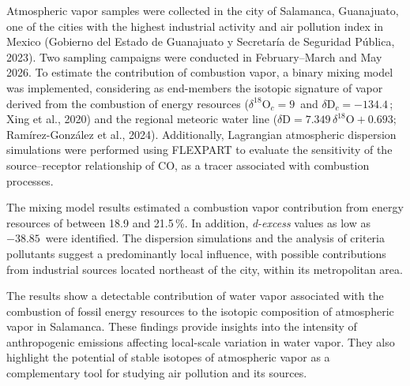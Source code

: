 Atmospheric vapor samples were collected in the city of 
Salamanca, Guanajuato, one of the cities with the highest 
industrial activity and air pollution index in Mexico 
(Gobierno del Estado de Guanajuato y Secretaría de Seguridad Pública, 2023). 
Two sampling campaigns were conducted in February--March and May 2026. To 
estimate the contribution of combustion vapor, a binary mixing model was 
implemented, considering as end-members the isotopic signature of vapor derived 
from the combustion of energy resources ($\delta^{18}\mathrm{O}_c = 9$\,\textperthousand{} 
and $\delta\mathrm{D}_c = -134.4$\,\textperthousand{}; Xing et al., 2020) and 
the regional meteoric water line ($\delta\mathrm{D} = 7.349\,\delta^{18}\mathrm{O} + 0.693$; 
Ramírez-González et al., 2024). Additionally, Lagrangian atmospheric dispersion 
simulations were performed using FLEXPART to evaluate the sensitivity of the 
source--receptor relationship of CO, as a tracer associated with combustion processes.

The mixing model results estimated a combustion vapor contribution from 
energy resources of between 18.9 and 21.5\,\%. In addition, \textit{d-excess} 
values as low as $-38.85$\,\textperthousand{} were identified. The dispersion 
simulations and the analysis of criteria pollutants suggest a predominantly 
local influence, with possible contributions from industrial sources 
located northeast of the city, within its metropolitan area.

The results show a detectable contribution of water vapor associated with 
the combustion of fossil energy resources to the isotopic composition of 
atmospheric vapor in Salamanca. These findings provide insights into the 
intensity of anthropogenic emissions affecting local-scale variation in water vapor. 
They also highlight the potential of stable isotopes of atmospheric vapor 
as a complementary tool for studying air pollution and its sources.












    
